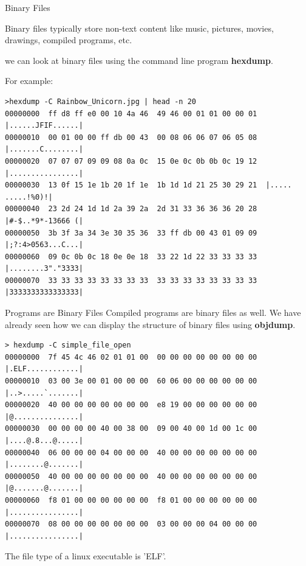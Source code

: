 \documentclass[10pt]{beamer}
\begin{document}
\begin{frame}[fragile]{Binary Files}

Binary files typically store non-text content like music, pictures, movies, drawings, compiled programs, etc.

we can look at binary files using the command line program \textbf{hexdump}.

For example:
\fontsize{8pt}{8pt}\selectfont
\begin{verbatim}
>hexdump -C Rainbow_Unicorn.jpg | head -n 20
00000000  ff d8 ff e0 00 10 4a 46  49 46 00 01 01 00 00 01  |......JFIF......|
00000010  00 01 00 00 ff db 00 43  00 08 06 06 07 06 05 08  |.......C........|
00000020  07 07 07 09 09 08 0a 0c  15 0e 0c 0b 0b 0c 19 12  |................|
00000030  13 0f 15 1e 1b 20 1f 1e  1b 1d 1d 21 25 30 29 21  |..... .....!%0)!|
00000040  23 2d 24 1d 1d 2a 39 2a  2d 31 33 36 36 36 20 28  |#-$..*9*-13666 (|
00000050  3b 3f 3a 34 3e 30 35 36  33 ff db 00 43 01 09 09  |;?:4>0563...C...|
00000060  09 0c 0b 0c 18 0e 0e 18  33 22 1d 22 33 33 33 33  |........3"."3333|
00000070  33 33 33 33 33 33 33 33  33 33 33 33 33 33 33 33  |3333333333333333|
\end{verbatim}
   
\end{frame}
\begin{frame}[fragile]{Programs are Binary Files}
Compiled programs are binary files as well.  We have already seen how we can display the structure of binary files using \textbf{objdump}.
\fontsize{8pt}{8pt}\selectfont
\begin{verbatim}
> hexdump -C simple_file_open
00000000  7f 45 4c 46 02 01 01 00  00 00 00 00 00 00 00 00  |.ELF............|
00000010  03 00 3e 00 01 00 00 00  60 06 00 00 00 00 00 00  |..>.....`.......|
00000020  40 00 00 00 00 00 00 00  e8 19 00 00 00 00 00 00  |@...............|
00000030  00 00 00 00 40 00 38 00  09 00 40 00 1d 00 1c 00  |....@.8...@.....|
00000040  06 00 00 00 04 00 00 00  40 00 00 00 00 00 00 00  |........@.......|
00000050  40 00 00 00 00 00 00 00  40 00 00 00 00 00 00 00  |@.......@.......|
00000060  f8 01 00 00 00 00 00 00  f8 01 00 00 00 00 00 00  |................|
00000070  08 00 00 00 00 00 00 00  03 00 00 00 04 00 00 00  |................|

\end{verbatim}

The file type of a linux executable is 'ELF'.

\end{frame}
\end{document}
